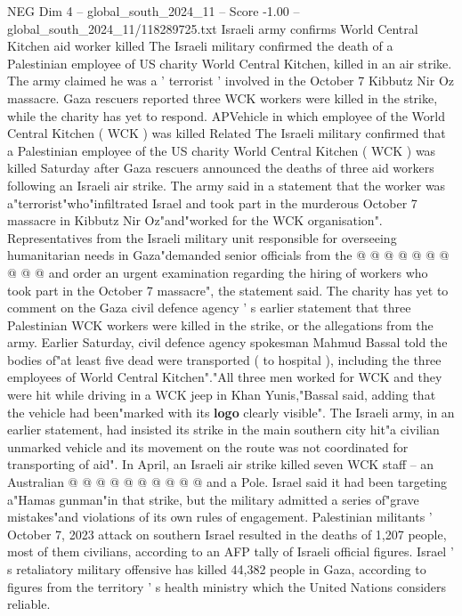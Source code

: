 \begin{textsample}{NEG Dim 4 – global\_south\_2024\_11 – Score -1.00 – global\_south\_2024\_11/118289725.txt}  \label{ex:f4_neg_171}
Israeli army confirms World Central Kitchen aid worker killed The Israeli military confirmed the death of a Palestinian employee of US charity World Central Kitchen, killed in an air strike.
The army claimed he was a ' terrorist ' involved in the October 7 Kibbutz Nir Oz massacre.
Gaza rescuers reported three WCK workers were killed in the strike, while the charity has yet to respond.
APVehicle in which employee of the World Central Kitchen ( WCK ) was killed Related The Israeli military confirmed that a Palestinian employee of the US charity World Central Kitchen ( WCK ) was killed Saturday after Gaza rescuers announced the deaths of three aid workers following an Israeli air strike.
The army said in a statement that the worker was a"terrorist"who"infiltrated Israel and took part in the murderous October 7 massacre in Kibbutz Nir Oz"and"worked for the WCK organisation".
Representatives from the Israeli military unit responsible for overseeing humanitarian needs in Gaza"demanded senior officials from the @ @ @ @ @ @ @ @ @ @ and order an urgent examination regarding the hiring of workers who took part in the October 7 massacre", the statement said.
The charity has yet to comment on the Gaza civil defence agency ' s earlier statement that three Palestinian WCK workers were killed in the strike, or the allegations from the army.
Earlier Saturday, civil defence agency spokesman Mahmud Bassal told the bodies of"at least five dead were transported ( to hospital ), including the three employees of World Central Kitchen"."All three men worked for WCK and they were hit while driving in a WCK jeep in Khan Yunis,"Bassal said, adding that the vehicle had been"marked with its \textbf{logo} clearly visible".
The Israeli army, in an earlier statement, had insisted its strike in the main southern city hit"a civilian unmarked vehicle and its movement on the route was not coordinated for transporting of aid".
In April, an Israeli air strike killed seven WCK staff -- an Australian @ @ @ @ @ @ @ @ @ @ and a Pole.
Israel said it had been targeting a"Hamas gunman"in that strike, but the military admitted a series of"grave mistakes"and violations of its own rules of engagement.
Palestinian militants ' October 7, 2023 attack on southern Israel resulted in the deaths of 1,207 people, most of them civilians, according to an AFP tally of Israeli official figures.
Israel ' s retaliatory military offensive has killed 44,382 people in Gaza, according to figures from the territory ' s health ministry which the United Nations considers reliable.

\end{textsample}
